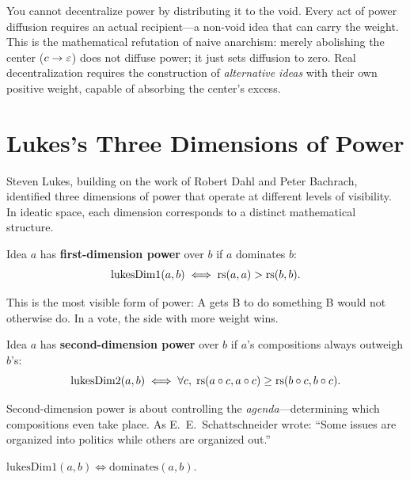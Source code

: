 \begin{interpretation}
You cannot decentralize power by distributing it to the void. Every act of
power diffusion requires an actual recipient---a non-void idea that can carry
the weight. This is the mathematical refutation of naive anarchism: merely
abolishing the center ($c \to \varepsilon$) does not diffuse power; it just sets
diffusion to zero. Real decentralization requires the construction of
\emph{alternative ideas} with their own positive weight, capable of absorbing
the center's excess.
\end{interpretation}

\section{Lukes's Three Dimensions of Power}

Steven Lukes, building on the work of Robert Dahl and Peter Bachrach,
identified three dimensions of power that operate at different levels of
visibility. In ideatic space, each dimension corresponds to a distinct
mathematical structure.

\begin{definition}
\label{def:lukes-dim1}
Idea $a$ has \textbf{first-dimension power} over $b$ if $a$ dominates $b$:
\[
  \mathrm{lukesDim1}(a, b) \iff \mathrm{rs}(a,a) > \mathrm{rs}(b,b).
\]
\end{definition}

This is the most visible form of power: A gets B to do something B would not
otherwise do. In a vote, the side with more weight wins.

\begin{definition}
\label{def:lukes-dim2}
Idea $a$ has \textbf{second-dimension power} over $b$ if $a$'s compositions
always outweigh $b$'s:
\[
  \mathrm{lukesDim2}(a, b) \iff \forall c,\; \mathrm{rs}(a \circ c, a \circ c) \geq \mathrm{rs}(b \circ c, b \circ c).
\]
\end{definition}

Second-dimension power is about controlling the \emph{agenda}---determining
which compositions even take place. As E.~E.~Schattschneider wrote: ``Some
issues are organized into politics while others are organized out.''

\begin{theorem}
\label{thm:lukes-dim1-domination}
$\mathrm{lukesDim1}(a,b) \iff \mathrm{dominates}(a,b)$.
\end{theorem}

